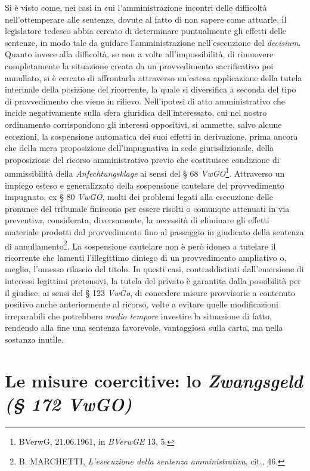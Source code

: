 \documentclass[12pt,it,a4paper,]{report}
\begin{document}
Si è visto come, nei casi in cui l'amministrazione incontri delle
difficoltà nell'ottemperare alle sentenze, dovute al fatto di non sapere
come attuarle, il legislatore tedesco abbia cercato di determinare
puntualmente gli effetti delle sentenze, in modo tale da guidare
l'amministrazione nell'esecuzione del \emph{decisium}. Quanto invece
alla difficoltà, se non a volte all'impossibilità, di rimuovere
completamente la situazione creata da un provvedimento sacrificativo poi
annullato, si è cercato di affrontarla attraverso un'estesa applicazione
della tutela interinale della posizione del ricorrente, la quale si
diversifica a seconda del tipo di provvedimento che viene in rilievo.
Nell'ipotesi di atto amministrativo che incide negativamente sulla sfera
giuridica dell'interessato, cui nel nostro ordinamento corrispondono gli
interessi oppositivi, si ammette, salvo alcune eccezioni, la sospensione
automatica dei suoi effetti in derivazione, prima ancora che della mera
proposizione dell'impugnativa in sede giurisdizionale, della
proposizione del ricorso amministrativo previo che costituisce
condizione di ammissibilità della \emph{Anfechtungsklage} ai sensi del §
68 \emph{VwGO}\footnote{BVerwG, 21.06.1961, in \emph{BVerwGE} 13, 5.}.
Attraverso un impiego esteso e generalizzato della sospensione cautelare
del provvedimento impugnato, ex § 80 \emph{VwGO}, molti dei problemi
legati alla esecuzione delle pronunce del tribunale finiscono per essere
risolti o comunque attenuati in via preventiva, considerata,
diversamente, la necessità di eliminare gli effetti materiale prodotti
dal provvedimento fino al passaggio in giudicato della sentenza di
annullamento\footnote{B. MARCHETTI, \emph{L'esecuzione della sentenza
  amministrativa}, cit., 46.}. La sospensione cautelare non è però
idonea a tutelare il ricorrente che lamenti l'illegittimo diniego di un
provvedimento ampliativo o, meglio, l'omesso rilascio del titolo. In
questi casi, contraddistinti dall'emersione di interessi legittimi
pretensivi, la tutela del privato è garantita dalla possibilità per il
giudice, ai sensi del § 123 \emph{VwGo}, di concedere misure provvisorie
a contenuto positivo anche anteriormente al ricorso, volte a evitare
quelle modificazioni irreparabili che potrebbero \emph{medio tempore}
investire la situazione di fatto, rendendo alla fine una sentenza
favorevole, vantaggiosa sulla carta, ma nella sostanza inutile.

\hypertarget{le-misure-coercitive-lo-zwangsgeld-172-vwgo}{%
\section{\texorpdfstring{Le misure coercitive: lo \emph{Zwangsgeld (§
172
VwGO)}}{Le misure coercitive: lo Zwangsgeld (§ 172 VwGO)}}\label{le-misure-coercitive-lo-zwangsgeld-172-vwgo}}
\end{document}
